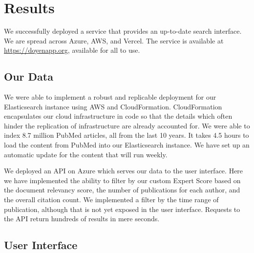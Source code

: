 \section{Results}

\def\figwidth{0.9\textwidth}

We successfully deployed a service that provides an up-to-date search interface. We are spread across Azure, AWS, and Vercel. The service is available at \url{https://doyenapp.org}, available for all to use.

\subsection{Our Data}

We were able to implement a robust and replicable deployment for our Elasticsearch instance using AWS and CloudFormation. CloudFormation encapsulates our cloud infrastructure in code so that the details which often hinder the replication of infrastructure are already accounted for. We were able to index 8.7 million PubMed articles, all from the last 10 years. It takes 4.5 hours to load the content from PubMed into our Elasticsearch instance. We have set up an automatic update for the content that will run weekly.

We deployed an API on Azure which serves our data to the user interface. Here we have implemented the ability to filter by our custom Expert Score based on the document relevancy score, the number of publications for each author, and the overall citation count. We implemented a filter by the time range of publication, although that is not yet exposed in the user interface. Requests to the API return hundreds of results in mere seconds.

\subsection{User Interface}

